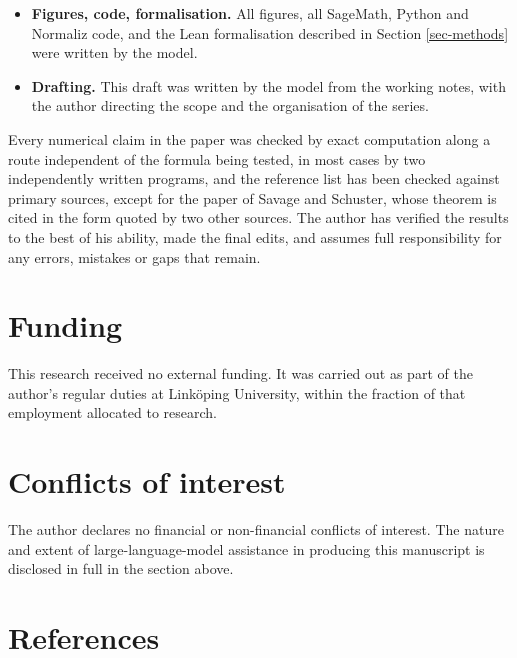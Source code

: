 \documentclass[11pt, a4paper, abstract=yes]{scrartcl}
\theoremstyle{definition}
\theoremstyle{remark}
\theoremstyle{plain}
\theoremstyle{remark}
\theoremstyle{plain}
\begin{document}
\begin{itemize}
\(n-1\) follows an unrepeated value (Example \ref{ex-codegree-product}). Reviewed. The direct proof of
Lemma \ref{lem-interior-points}(2) was written by the model later, when the lemma was moved ahead of
Proposition \ref{prop-hstar-props}, and has been checked by computation only.
\item \textbf{Figures, code, formalisation.} All figures, all SageMath, Python and Normaliz code, and the Lean
formalisation described in Section \ref{sec-methods} were written by the model.
\item \textbf{Drafting.} This draft was written by the model from the working notes, with the author directing
the scope and the organisation of the series.
\end{itemize}

Every numerical claim in the paper was checked by exact computation along a route independent of the
formula being tested, in most cases by two independently written programs, and the reference list has
been checked against primary sources, except for the paper of Savage and Schuster, whose theorem is
cited in the form quoted by two other sources. The author has verified the results to the best of his
ability, made the final edits, and assumes full responsibility for any errors, mistakes or gaps that
remain.
\section*{Funding}
\label{sec:orgd684e80}
This research received no external funding. It was carried out as part of the author's regular duties
at Linköping University, within the fraction of that employment allocated to research.
\section*{Conflicts of interest}
\label{sec:orgbd1fb0a}
The author declares no financial or non-financial conflicts of interest. The nature and extent of
large-language-model assistance in producing this manuscript is disclosed in full in the section
above.
\section*{References}
\label{sec:orgd064365}
\printbibliography[heading=none]
\end{document}

